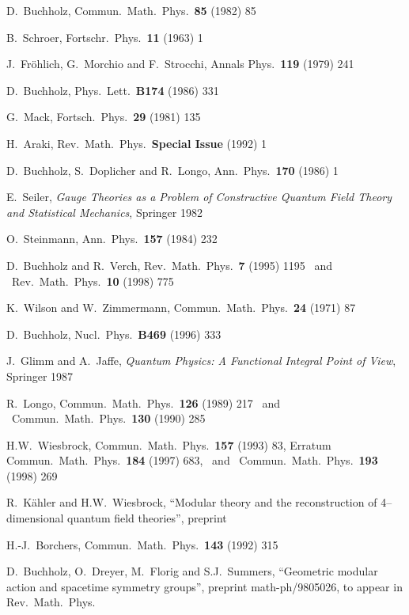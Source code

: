\begin{thebibliography}{99}
 D.\ Buchholz, Commun.\ Math.\ Phys.\, 
{\bf 85} (1982) 85                                 

 B.\ Schroer, Fortschr.\ Phys.\ {\bf 11} (1963) 1

 J.\ Fr\"ohlich, G.\ Morchio and F.\ Strocchi, 
Annals Phys.\ {\bf 119} (1979) 241

 D.\ Buchholz,
Phys.\ Lett.\ {\bf B174} (1986) 331

 G.\ Mack, 
Fortsch.\ Phys.\ {\bf 29} (1981) 135

 H.\ Araki, 
Rev.\ Math.\ Phys.\  {\bf Special Issue} (1992) 1 

 D.\ Buchholz, S.\ Doplicher and R.\ Longo,
Ann.\ Phys.\ {\bf 170} (1986) 1 

 E.\ Seiler, 
{\it Gauge Theories as a Problem of Constructive Quantum Field Theory
and Statistical Mechanics}, Springer  1982

 O.\ Steinmann, 
Ann.\ Phys.\ {\bf 157} (1984) 232  

D.\ Buchholz and R.\ Verch,
Rev.\ Math.\ Phys.\ {\bf 7} (1995) 1195 \ and \
Rev.\ Math.\ Phys.\ {\bf 10} (1998) 775

K.\ Wilson and W.\ Zimmermann, 
Commun.\ Math.\ Phys.\ {\bf 24} (1971) 87

D.\ Buchholz,
Nucl.\ Phys.\ {\bf B469} (1996) 333

 J.\ Glimm and A.\ Jaffe, {\it Quantum Physics: A 
Functional Integral Point of View}, Springer 1987 


 R.\ Longo,
Commun.\ Math.\ Phys.\ {\bf 126} (1989) 217 \ and \
Commun.\ Math.\ Phys.\ {\bf 130} (1990) 285

 H.W.\ Wiesbrock,
Commun.\ Math.\ Phys.\ {\bf 157} (1993) 83, Erratum 
Commun.\ Math.\ Phys.\ {\bf 184} (1997) 683, \ and \ 
Commun.\ Math.\ Phys.\ {\bf 193} (1998) 269

\bibitem{KaWi} R.\ K\"ahler and H.W.\ Wiesbrock, 
``Modular theory and the reconstruction of 4--dimensional 
quantum field theories'', preprint   

\bibitem{Bo2} H.-J.\ Borchers, 
Commun.\ Math.\ Phys.\ {\bf 143} (1992) 315
 
\bibitem{BuDrFlSu} 
D.\ Buchholz, O.\ Dreyer, M.\ Florig and S.J.\ Summers, 
``Geometric modular action and spacetime symmetry groups'',
preprint math-ph/9805026, to appear in Rev.\ Math.\ Phys. 


\end{thebibliography}
